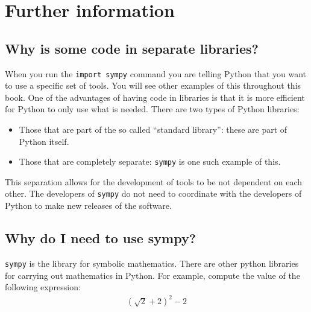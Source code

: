 \section{Further information}
\label{\detokenize{tools-for-mathematics/02-algebra/why/main:further-information}}\label{\detokenize{tools-for-mathematics/02-algebra/why/main::doc}}

\subsection{Why is some code in separate libraries?}
\label{\detokenize{tools-for-mathematics/02-algebra/why/main:why-is-some-code-in-separate-libraries}}

When you run the \texttt{import sympy} command you are telling Python that you want to use
a specific set of tools. You will see other examples of this throughout this
book.
One of the advantages of having code in libraries is that it is more efficient
for Python to only use what is needed.
There are two types of Python libraries:
\begin{itemize}
\item 

Those that are part of the so called “standard library”: these are part of
Python itself.

\item 

Those that are completely separate: \texttt{sympy} is one such example of this.

\end{itemize}


This separation allows for the development of tools to be not dependent on each
other. The developers of \texttt{sympy} do not need to coordinate with the developers
of Python to make new releases of the software.


\subsection{Why do I need to use sympy?}
\label{\detokenize{tools-for-mathematics/02-algebra/why/main:why-do-we-need-to-use-sympy}}

\texttt{sympy} is the library for symbolic mathematics. There are other python libraries
for carrying out mathematics in Python.
For example, compute the value of the following expression:
\begin{equation*}
\begin{split}
    (\sqrt{2} + 2) ^ 2 - 2
\end{split}
\end{equation*}

